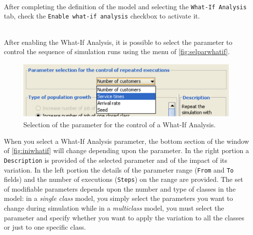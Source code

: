 \\ After
completing the definition of the model and selecting the
\texttt{What-If Analysis} tab, check the \texttt{Enable what-if
analysis} checkbox to activate it.

\\ After enabling
the What-If Analysis, it is possible to select the parameter to
control the sequence of simulation runs using the menu of
\autoref{fig:selparwhatif}.
\begin{figure}[hbt]
    \begin{center}
        \includegraphics[scale=.5]{img/jsimg/7.2.eps}
    \end{center}
    \caption{Selection of the parameter for the control
    of a What-If Analysis.}
    \label{fig:selparwhatif}
\end{figure}
When you select a What-If Analysis parameter, the bottom section
of the window of \autoref{fig:iniwhatif} will change depending
upon the parameter. In the right portion a \texttt{Description} is
provided of the selected parameter and of the impact of its
variation. In the left portion the details of the parameter range
(\texttt{From} and \texttt{To} fields) and the number of
executions (\texttt{Steps}) on the range are provided. The set of
modifiable parameters depends upon the number and type of classes
in the model: in a \emph{single class} model, you simply select
the parameters you want to change during simulation while in a
\emph{multiclass} model, you must select the parameter and specify
whether you want to apply the variation to all the classes or just
to one specific class.\\

